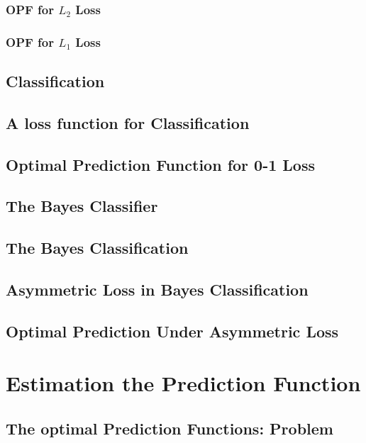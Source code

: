 \documentclass[11pt,a4paper]{article}
\begin{document}
\subsubsection{OPF for $L_2$ Loss}

\subsubsection{OPF for $L_1$ Loss}

\subsection{Classification}

\subsection{A loss function for Classification}

\subsection{Optimal Prediction Function for 0-1 Loss}

\subsection{The Bayes Classifier}

\subsection{The Bayes Classification}

\subsection{Asymmetric Loss in Bayes Classification}

\subsection{Optimal Prediction Under Asymmetric Loss}

\section{Estimation the Prediction Function}

\subsection{The optimal Prediction Functions: Problem}
\end{document}
